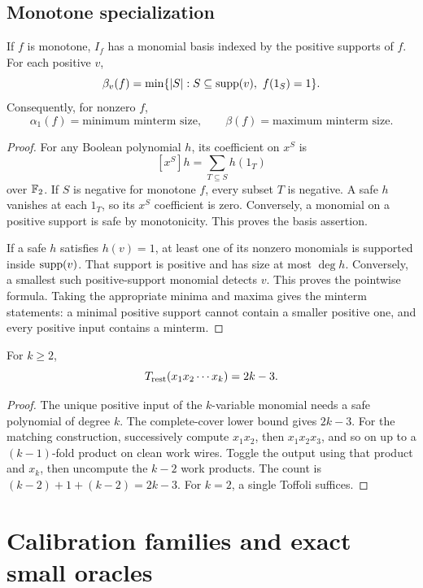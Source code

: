 \section{Monotone specialization}
\begin{theorem}\label{c:thm:monotone}
If $f$ is monotone, $I_f$ has a monomial basis indexed by the positive supports of $f$. For each positive $v$,
\[
 \beta_v(f)=\min\{|S|: S\subseteq\supp(v),\ f(1_S)=1\}.
\]
Consequently, for nonzero $f$,
\[
 \alpha_1(f)=\text{minimum minterm size},\qquad
 \beta(f)=\text{maximum minterm size}.
\]
\end{theorem}
\begin{proof}
For any Boolean polynomial $h$, its coefficient on $x^S$ is
\[
 [x^S]h=\sum_{T\subseteq S}h(1_T)
\]
over $\mathbb F_2$. If $S$ is negative for monotone $f$, every subset $T$ is negative. A safe $h$ vanishes at each $1_T$, so its $x^S$ coefficient is zero. Conversely, a monomial on a positive support is safe by monotonicity. This proves the basis assertion.

If a safe $h$ satisfies $h(v)=1$, at least one of its nonzero monomials is supported inside $\operatorname{supp}(v)$. That support is positive and has size at most $\deg h$. Conversely, a smallest such positive-support monomial detects $v$. This proves the pointwise formula. Taking the appropriate minima and maxima gives the minterm statements: a minimal positive support cannot contain a smaller positive one, and every positive input contains a minterm.
\end{proof}

\begin{corollary}\label{c:cor:monomial}
For $k\ge2$,
\[
 T_{\mathrm{rest}}(x_1x_2\cdots x_k)=2k-3.
\]
\end{corollary}
\begin{proof}
The unique positive input of the $k$-variable monomial needs a safe polynomial of degree $k$. The complete-cover lower bound gives $2k-3$. For the matching construction, successively compute $x_1x_2$, then $x_1x_2x_3$, and so on up to a $(k-1)$-fold product on clean work wires. Toggle the output using that product and $x_k$, then uncompute the $k-2$ work products. The count is $(k-2)+1+(k-2)=2k-3$. For $k=2$, a single Toffoli suffices.
\end{proof}

\chapter{Calibration families and exact small oracles}
\label{c:ch:calibration}
